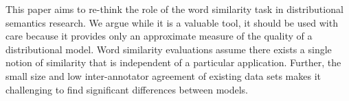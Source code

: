 This paper aims to re-think the role of the word similarity task in distributional semantics research. We argue while it is a valuable tool, it should be used with care because it provides only an approximate measure of the quality of a distributional model. Word similarity evaluations assume there exists a single notion of similarity that is independent of a particular application. Further, the small size and low inter-annotator agreement of existing data sets makes it challenging to find significant differences between models.
